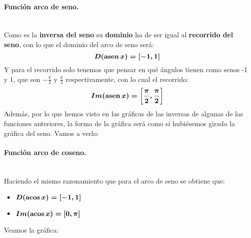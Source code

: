 \documentclass[a4paper,11pt,answers]{exam}
\begin{document}
\paragraph{Función arco de seno.}\mbox{}\\
Como es la \textbf{inversa del seno} su \textbf{dominio} ha de ser igual al \textbf{recorrido del seno}, con lo que el dominio del arco de seno será:
\[\boldsymbol{D(\mathrm{asen\,} x) = [-1, 1]}\]
Y para el recorrido solo tenemos que pensar en qué ángulos tienen como senos -1 y 1, que son $-\frac{\pi}{2}$ y $\frac{\pi}{2}$ respectivamente, con lo cual el recorrido:
\[\boldsymbol{Im(\mathrm{asen\,} x) = \left[\frac{\pi}{2}, \frac{\pi}{2}\right]}\]
Además, por lo que hemos visto en las gráficas de las inversas de algunas de las funciones anteriores, la forma de la gráfica será como si hubiésemos girado la gráfica del seno. Vamos a verlo: 
\begin{center}
\end{center}
\paragraph{Función arco de coseno.}\mbox{}\\
Haciendo el mismo razonamiento que para el arco de seno se obtiene que:
\begin{itemize}
	\item $\boldsymbol{D(\mathrm{acos\,} x) = [-1, 1]}$
	\item $\boldsymbol{Im(\mathrm{acos\,} x) = [0,\pi]}$
\end{itemize}
Veamos la gráfica:
\begin{center}
\end{center}
\end{document}
